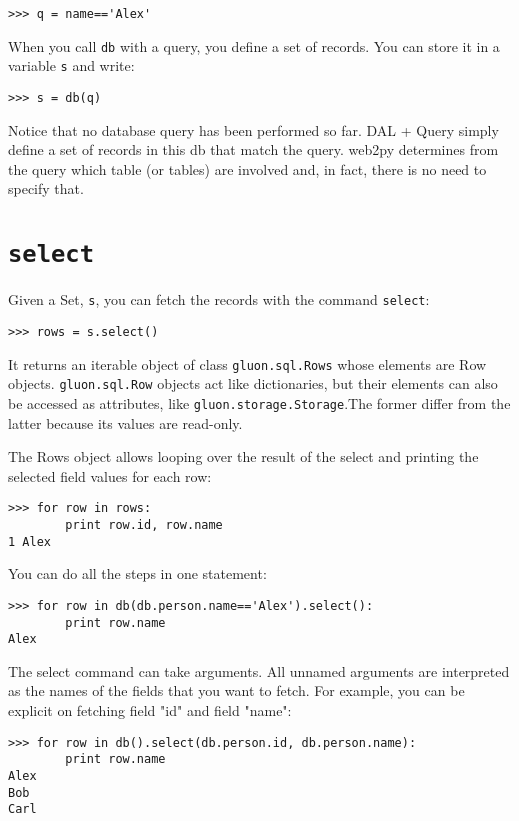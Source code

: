 \documentclass[justified,sixbynine,notoc]{tufte-book}
\def\ft{\small\tt}
\def\inxx#1{\index{#1}}
\begin{document}
\begin{fullwidth}
\inxx{Query}
\begin{lstlisting}
>>> q = name=='Alex'
\end{lstlisting}

When you call {\ft db} with a query, you define a set of records. You can store it in a variable {\ft s} and write:

\inxx{Set}
\begin{lstlisting}
>>> s = db(q)
\end{lstlisting}

Notice that no database query has been performed so far. DAL + Query simply define a set of records in this db that match the query.
web2py determines from the query which table (or tables) are involved and, in fact, there is no need to specify that.

\goodbreak\section{{\ft select}}

Given a Set, {\ft s}, you can fetch the records with the command {\ft select}:

\inxx{Rows} \inxx{select}
\begin{lstlisting}
>>> rows = s.select()
\end{lstlisting}

\inxx{Row}
It returns an iterable object of class {\ft gluon.sql.Rows} whose elements are Row objects. {\ft gluon.sql.Row} objects act like dictionaries, but their elements can also be accessed as attributes, like {\ft gluon.storage.Storage}.The former differ from the latter because its values are read-only.

The Rows object allows looping over the result of the select and printing the selected field values for each row:
\begin{lstlisting}
>>> for row in rows:
        print row.id, row.name
1 Alex
\end{lstlisting}

You can do all the steps in one statement:
\begin{lstlisting}
>>> for row in db(db.person.name=='Alex').select():
        print row.name
Alex
\end{lstlisting}

\inxx{ALL}

The select command can take arguments. All unnamed arguments are interpreted as the names of the fields that you want to fetch. For example, you can be explicit on fetching field "id" and field "name":
\begin{lstlisting}
>>> for row in db().select(db.person.id, db.person.name):
        print row.name
Alex
Bob
Carl
\end{lstlisting}


\end{fullwidth}
\end{document}
